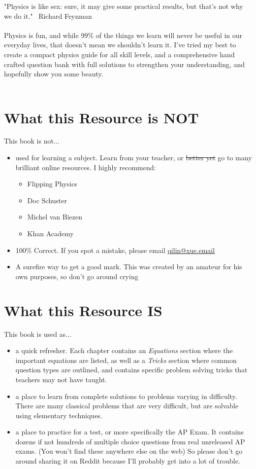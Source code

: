 "Physics is like sex: sure, it may give some practical results, but that's not why we do it." ~Richard Feynman
\\\\
Physics is fun, and while 99\% of the things we learn will never be useful in our everyday lives, that doesn't mean we shouldn't learn it. I've tried my best to create a compact physics guide for all skill levels, and a comprehensive hand crafted question bank with full solutions to strengthen your understanding, and hopefully show you some beauty.
\\\\

\section*{What this Resource is NOT}

This book is not...
\begin{itemize}
    \item used for learning a subject. Learn from your teacher, or \sout{better yet} go to many brilliant online resources. I highly recommend:
    \begin{itemize}
        \item Flipping Physics
        \item Doc Schuster
        \item Michel van Biezen
        \item Khan Academy
    \end{itemize}
    \item 100\% Correct. If you spot a mistake, please email \href{mailto:qilin@xue.email}{qilin@xue.email}
    \item A surefire way to get a good mark. This was created by an amateur for his own purposes, so don't go around crying
\end{itemize}
\newpage
\section*{What this Resource IS}
This book is used as...
\begin{itemize}
    \item a quick refresher. Each chapter contains an \emph{Equations} section where the important equations are listed, as well as a \emph{Tricks} section where common question types are outlined, and contains specific problem solving tricks that teachers may not have taught.
    \item a place to learn from complete solutions to problems varying in difficulty. There are many classical problems that are very difficult, but are solvable using elementary techniques.
    \item a place to practice for a test, or more specifically the AP Exam. It contains dozens if not hundreds of multiple choice questions from real unreleased AP exams. (You won't find these anywhere else on the web) So please don't go around sharing it on Reddit because I'll probably get into a lot of trouble.
\end{itemize}